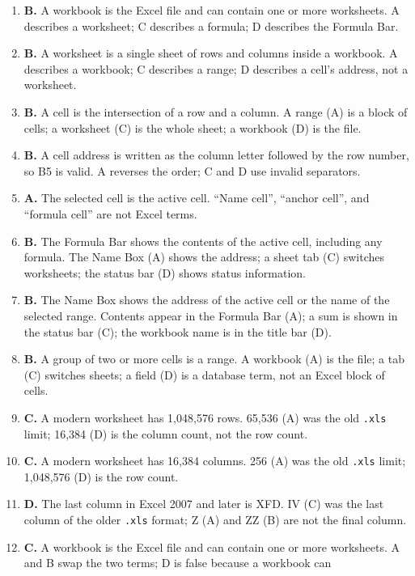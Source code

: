 \begin{enumerate}[label=\textbf{Q\arabic*.}, leftmargin=*]
\item \textbf{B.} A workbook is the Excel file and can contain one or more
  worksheets. A describes a worksheet; C describes a formula; D describes the
  Formula Bar.
\item \textbf{B.} A worksheet is a single sheet of rows and columns inside a
  workbook. A describes a workbook; C describes a range; D describes a cell's
  address, not a worksheet.
\item \textbf{B.} A cell is the intersection of a row and a column. A range
  (A) is a block of cells; a worksheet (C) is the whole sheet; a workbook (D)
  is the file.
\item \textbf{B.} A cell address is written as the column letter followed by
  the row number, so B5 is valid. A reverses the order; C and D use invalid
  separators.
\item \textbf{A.} The selected cell is the active cell. ``Name cell'', ``anchor
  cell'', and ``formula cell'' are not Excel terms.
\item \textbf{B.} The Formula Bar shows the contents of the active cell,
  including any formula. The Name Box (A) shows the address; a sheet tab (C)
  switches worksheets; the status bar (D) shows status information.
\item \textbf{B.} The Name Box shows the address of the active cell or the
  name of the selected range. Contents appear in the Formula Bar (A); a sum
  is shown in the status bar (C); the workbook name is in the title bar (D).
\item \textbf{B.} A group of two or more cells is a range. A workbook (A) is
  the file; a tab (C) switches sheets; a field (D) is a database term, not an
  Excel block of cells.
\item \textbf{C.} A modern worksheet has 1,048,576 rows. 65,536 (A) was the
  old \texttt{.xls} limit; 16,384 (D) is the column count, not the row count.
\item \textbf{C.} A modern worksheet has 16,384 columns. 256 (A) was the old
  \texttt{.xls} limit; 1,048,576 (D) is the row count.
\item \textbf{D.} The last column in Excel 2007 and later is XFD. IV (C) was
  the last column of the older \texttt{.xls} format; Z (A) and ZZ (B) are not
  the final column.
\item \textbf{C.} A workbook is the Excel file and can contain one or more
  worksheets. A and B swap the two terms; D is false because a workbook can

\end{enumerate}
